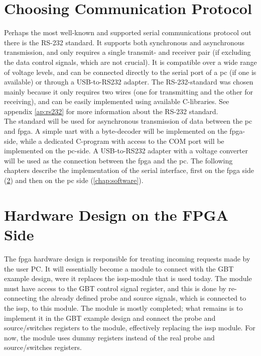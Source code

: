 \documentclass[main.tex]{subfiles}
\begin{document}
\section{Choosing Communication Protocol}
Perhaps the most well-known and supported serial communications protocol out there is the RS-232 standard. It supports both synchronous and asynchronous transmission, and only requires a single transmit- and receiver pair (if excluding the data control signals, which are not crucial). It is compatible over a wide range of voltage levels, and can be connected directly to the serial port of a \acrshort{pc} (if one is available) or through a USB-to-RS232 adapter. The RS-232-standard was chosen mainly because it only requires two wires (one for transmitting and the other for receiving), and can be easily implemented using available C-libraries. See appendix \ref{ap:rs232} for more information about the RS-232 standard.\\

The standard will be used for asynchronous transmission of data between the \acrshort{pc} and \gls{fpga}. A simple \gls{uart} with a byte-decoder will be implemented on the \gls{fpga}-side, while a dedicated C-program with access to the COM port will be implemented on the \acrshort{pc}-side. A USB-to-RS232 adapter with a voltage converter will be used as the connection between the \gls{fpga} and the \acrshort{pc}. The following chapters describe the implementation of the serial interface, first on the \gls{fpga} side (\ref{chap:hardware}) and then on the \acrshort{pc} side (\ref{chap:software}).


\section{Hardware Design on the FPGA Side} \label{chap:hardware}

The \gls{fpga} hardware design is responsible for treating incoming requests made by the user PC. It will essentially become a module to connect with the GBT example design, were it replaces the \gls{issp}-module that is used today. The module must have access to the GBT control signal register, and this is done by re-connecting the already defined probe and source signals, which is connected to the \gls{issp}, to this module. The module is mostly completed; what remains is to implement it in the GBT example design and connect the probe and source/switches registers to the module, effectively replacing the \gls{issp} module. For now, the module uses dummy registers instead of the real probe and source/switches registers. 
\end{document}
